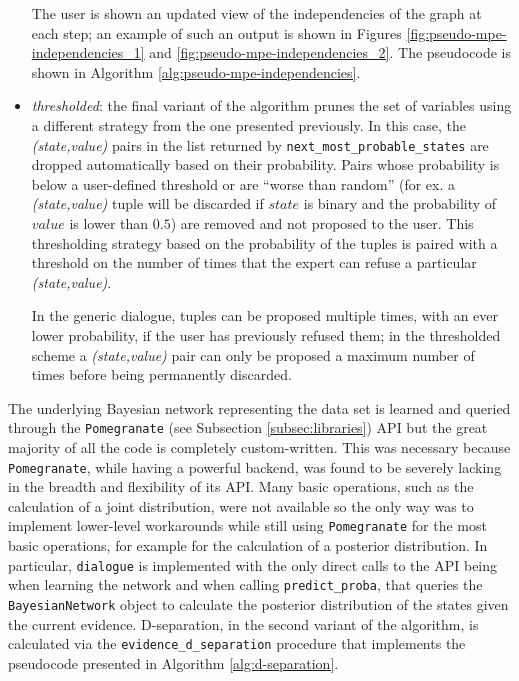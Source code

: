 \begin{itemize}
  	The user is shown an updated view of the independencies of the graph at each step; an example of such an output is shown in Figures \ref{fig:pseudo-mpe-independencies_1} and \ref{fig:pseudo-mpe-independencies_2}.
  	The pseudocode is shown in Algorithm \ref{alg:pseudo-mpe-independencies}.
  	
  \item \textit{thresholded}: the final variant of the algorithm prunes the set of variables using a different strategy from the one presented previously.
  	In this case, the \textit{(state,value)} pairs in the list returned by \texttt{next\_most\_probable\_states} are dropped automatically based on their probability.
  	Pairs whose probability is below a user-defined threshold or are \enquote{worse than random} (for ex. a \textit{(state,value)} tuple will be discarded if $state$ is binary and the probability of $value$ is lower than $0.5$) are removed and not proposed to the user. 
  	This thresholding strategy based on the probability of the tuples is paired with a threshold on the number of times that the expert can refuse a particular \textit{(state,value)}. 
  	
  	In the generic dialogue, tuples can be proposed multiple times, with an ever lower probability, if the user has previously refused them; in the thresholded scheme a \textit{(state,value)} pair can only be proposed a maximum number of times before being permanently discarded.
\end{itemize}

The underlying Bayesian network representing the data set is learned and queried through the  \texttt{Pomegranate} (see Subsection \ref{subsec:libraries}) API but the great majority of all the code is completely custom-written.
This was necessary because \texttt{Pomegranate}, while having a powerful backend, was found to be severely lacking in the breadth and flexibility of its API.
Many basic operations, such as the calculation of a joint distribution, were not available so the only way was to implement lower-level workarounds while still using \texttt{Pomegranate} for the most basic operations, for example for the calculation of a posterior distribution.
In particular, \texttt{dialogue} is implemented with the only direct calls to the API being when learning the network and when calling \texttt{predict\_proba}, that queries the \texttt{BayesianNetwork} object to calculate the posterior distribution of the states given the current evidence.
D-separation, in the second variant of the algorithm, is calculated via the \texttt{evidence\_d\_separation} procedure that implements the pseudocode presented in Algorithm \ref{alg:d-separation}.

